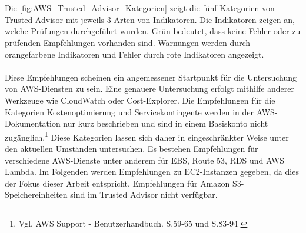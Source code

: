 \\\\
Die \autoref{fig:AWS_Trusted_Advisor_Kategorien} zeigt die fünf Kategorien von Trusted Advisor mit jeweils 3 Arten von Indikatoren. Die Indikatoren zeigen an, welche Prüfungen durchgeführt wurden. Grün bedeutet, dass keine Fehler oder zu prüfenden Empfehlungen vorhanden sind. Warnungen werden durch orangefarbene Indikatoren und Fehler durch rote Indikatoren angezeigt. 
\\\\
Diese Empfehlungen scheinen ein angemessener Startpunkt für die Untersuchung von AWS-Diensten zu sein. Eine genauere Untersuchung erfolgt mithilfe anderer Werkzeuge wie CloudWatch oder Cost-Explorer. %
Die Empfehlungen für die Kategorien Kostenoptimierung und Servicekontingente werden in der AWS-Dokumentation nur kurz beschrieben und sind in einem Basiskonto nicht zugänglich.\footnote{Vgl. AWS Support - Benutzerhandbuch. S.59-65 und S.83-94 \cite{AMZ37}} Diese Kategorien lassen sich daher in eingeschränkter Weise unter den aktuellen Umständen untersuchen.
%
Es bestehen Empfehlungen für verschiedene AWS-Dienste unter anderem für EBS, Route 53, RDS und AWS Lambda. Im Folgenden werden Empfehlungen zu EC2-Instanzen gegeben, da dies der Fokus dieser Arbeit entspricht. Empfehlungen für Amazon S3-Speichereinheiten sind im Trusted Advisor nicht verfügbar.
